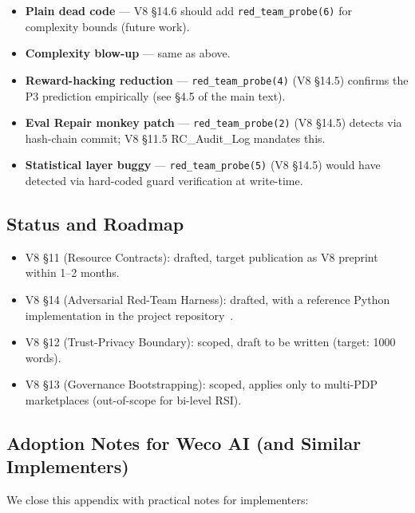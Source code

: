 \begin{itemize}
    \item \textbf{Plain dead code} --- V8 \S14.6 should add \texttt{red\_team\_probe(6)} for complexity bounds (future work).
    \item \textbf{Complexity blow-up} --- same as above.
    \item \textbf{Reward-hacking reduction} --- \texttt{red\_team\_probe(4)} (V8 \S14.5) confirms the P3 prediction empirically (see \S4.5 of the main text).
    \item \textbf{Eval Repair monkey patch} --- \texttt{red\_team\_probe(2)} (V8 \S14.5) detects via hash-chain commit; V8 \S11.5 RC\_Audit\_Log mandates this.
    \item \textbf{Statistical layer buggy} --- \texttt{red\_team\_probe(5)} (V8 \S14.5) would have detected via hard-coded guard verification at write-time.
\end{itemize}

\subsection{Status and Roadmap}

\begin{itemize}
    \item V8 \S11 (Resource Contracts): drafted, target publication as V8 preprint within 1--2 months.
    \item V8 \S14 (Adversarial Red-Team Harness): drafted, with a reference Python implementation in the project repository~\cite{anon2026bi}.
    \item V8 \S12 (Trust-Privacy Boundary): scoped, draft to be written (target: 1000 words).
    \item V8 \S13 (Governance Bootstrapping): scoped, applies only to multi-PDP marketplaces (out-of-scope for bi-level RSI).
\end{itemize}

\subsection{Adoption Notes for Weco AI (and Similar Implementers)}

We close this appendix with practical notes for implementers:

